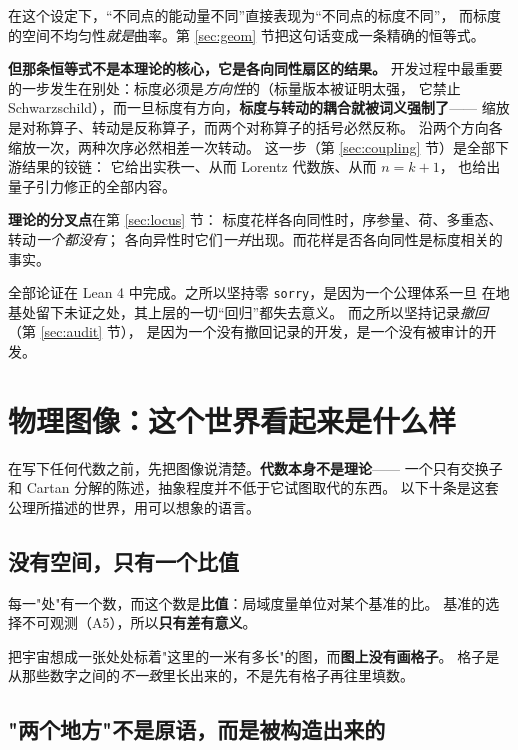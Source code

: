 \documentclass[11pt,a4paper]{article}
\theoremstyle{sudef}
\begin{document}
在这个设定下，“不同点的能动量不同”直接表现为“不同点的标度不同”，
而标度的空间不均匀性\emph{就是}曲率。第 \ref{sec:geom} 节把这句话变成一条精确的恒等式。

\medskip
\noindent\textbf{但那条恒等式不是本理论的核心，它是各向同性扇区的结果。}
开发过程中最重要的一步发生在别处：标度必须是\emph{方向性}的（标量版本被证明太强，
它禁止 Schwarzschild），而一旦标度有方向，\textbf{标度与转动的耦合就被词义强制了}——
缩放是对称算子、转动是反称算子，而两个对称算子的括号必然反称。
沿两个方向各缩放一次，两种次序必然相差一次转动。
这一步（第 \ref{sec:coupling} 节）是全部下游结果的铰链：
它给出实秩一、从而 Lorentz 代数族、从而 $n=k+1$，
也给出量子引力修正的全部内容。

\medskip
\noindent\textbf{理论的分叉点}在第 \ref{sec:locus} 节：
标度花样各向同性时，序参量、荷、多重态、转动\emph{一个都没有}；
各向异性时它们\emph{一并}出现。而花样是否各向同性是标度相关的事实。

\medskip
全部论证在 Lean 4 中完成。之所以坚持零 \texttt{sorry}，是因为一个公理体系一旦
在地基处留下未证之处，其上层的一切“回归”都失去意义。
而之所以坚持记录\emph{撤回}（第 \ref{sec:audit} 节），
是因为一个没有撤回记录的开发，是一个没有被审计的开发。

\section{物理图像：这个世界看起来是什么样}\label{sec:picture}

在写下任何代数之前，先把图像说清楚。\textbf{代数本身不是理论}——
一个只有交换子和 Cartan 分解的陈述，抽象程度并不低于它试图取代的东西。
以下十条是这套公理所描述的世界，用可以想象的语言。

\subsection{没有空间，只有一个比值}

每一"处"有一个数，而这个数是\textbf{比值}：局域度量单位对某个基准的比。
基准的选择不可观测（A5），所以\textbf{只有差有意义}。

\begin{mdframed}[linecolor=axcol,linewidth=1pt,backgroundcolor=axcol!5]
把宇宙想成一张处处标着"这里的一米有多长"的图，而\textbf{图上没有画格子}。
格子是从那些数字之间的\emph{不一致}里长出来的，不是先有格子再往里填数。
\end{mdframed}

\subsection{"两个地方"不是原语，而是被构造出来的}
\end{document}
